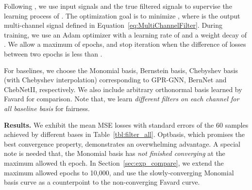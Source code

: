 Following \citet{He2021bern}, 
we use input signals  and the true filtered signals  
to supervise the learning process of . 
The optimization goal is to minimize , 
where  is the output multi-channel signal  defined in Equation~\eqref{eq:MultiChannelFilter}.
During training, 
we use an Adam optimizer with a learning rate of  and a weight decay of 
 .
We allow a maximum of  epochs, 
and stop iteration when the difference of losses between two epochs 
is less than .

For baselines, we choose the Monomial basis, Bernstein basis, 
Chebyshev basis (with Chebyshev interpolation) 
corresponding to GPR-GNN, BernNet and ChebNetII, respectively. 
We also include {arbitrary} orthonormal basis learned by Favard for comparison.
Note that, 
we learn \textit{different filters on each channel
for all baseline basis} for fairness.  


\textbf{Results.} We exhibit 
the mean MSE losses with standard errors of the 60 samples achieved by different bases in Table~\ref{tbl:filter_all}. Optbasis, which promises the best convergence property, demonstrates an overwhelming advantage. 
A special note is needed that, 
the Monomial basis has \textit{not finished converging} at the maximum allowed th epoch. In Section~\ref{sec:exp_compare}, we extend the maximum allowed epochs to 10,000, and use the slowly-converging Monomial basis curve as a counterpoint to the non-converging Favard curve. 

